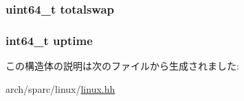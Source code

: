 \label{structSparcLinux_1_1tgt__sysinfo_a4e4ed68dad22afd974a82cbc557525dc}
\hypertarget{structSparcLinux_1_1tgt__sysinfo_a083d391d3cd3c507c32c0b3967fdb33c}{
\subsubsection[{totalswap}]{\setlength{\rightskip}{0pt plus 5cm}uint64\_\-t {\bf totalswap}}}
\label{structSparcLinux_1_1tgt__sysinfo_a083d391d3cd3c507c32c0b3967fdb33c}
\hypertarget{structSparcLinux_1_1tgt__sysinfo_a382d83f87fed25a254be85c2a0b40b03}{
\subsubsection[{uptime}]{\setlength{\rightskip}{0pt plus 5cm}int64\_\-t {\bf uptime}}}
\label{structSparcLinux_1_1tgt__sysinfo_a382d83f87fed25a254be85c2a0b40b03}


この構造体の説明は次のファイルから生成されました:\begin{DoxyCompactItemize}
\item 
arch/sparc/linux/\hyperlink{arch_2sparc_2linux_2linux_8hh}{linux.hh}\end{DoxyCompactItemize}
